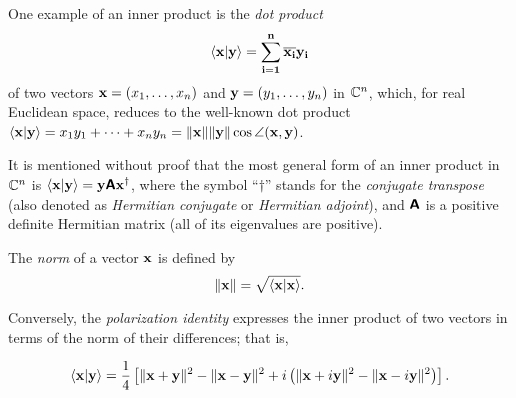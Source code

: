 {
\color{blue}
\bexample
One example of an inner product is  the
{\em dot product}
\begin{equation}
\langle {{\bf x}} \vert  \bf y \rangle
=
\sum_{i=1}^n \overline{x_i}y_i
\end{equation}
of two vectors ${\bf x}=
(x_1,\ldots , x_n)$
and
${\bf y}=
(y_1,\ldots , y_n)$ in ${\Bbb C}^n$,
which, for real Euclidean space,  reduces to the well-known dot product
$\langle  {\bf x} \vert {\bf y} \rangle
=
{x_1}y_1 + \cdots + {x_n}y_n  = \| {\bf x}\| \| {\bf y}\| \cos \angle ({\bf x},{\bf y})$.


It is mentioned without proof that the most general form of an inner product in ${\Bbb C}^n$
is
$\langle  {\bf x} \vert {\bf y} \rangle
=  {\bf y} \textsf{\textbf{A}} {\bf x}^\dagger$,
where the symbol ``$\dagger$'' stands for the {\em conjugate transpose} (also denoted as
{\em Hermitian conjugate} or {\em Hermitian adjoint}),
and $ \textsf{\textbf{A}} $ is a positive definite Hermitian matrix (all of its eigenvalues are positive).
\eexample
}



The {\em norm} of a vector ${\bf x}$
is defined by
\begin{equation}
\|
{\bf x}
\|
=\sqrt{\langle {\bf x}\vert {\bf x}\rangle }
.
\end{equation}

Conversely, the {\em polarization identity}
expresses the inner product of two vectors in terms of the norm of their differences; that is,

\begin{equation}
\langle {\bf x}\vert {\bf y}\rangle
=
\frac{1}{4}\left[
\|  {\bf x}+ {\bf y} \|^2
-
\|  {\bf x}- {\bf y} \|^2
+ i
\left(
\|  {\bf x}+ i{\bf y} \|^2
-
\|  {\bf x}- i{\bf y} \|^2
\right)
\right]
.
\label{2015-m-ch-polidc}
\end{equation}


